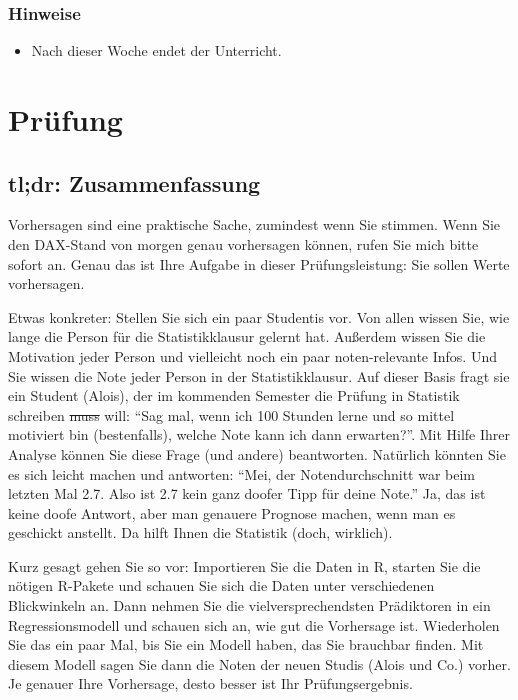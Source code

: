 \documentclass[
]{book}
\providecommand{\tightlist}{%
  \setlength{\itemsep}{0pt}\setlength{\parskip}{0pt}}
\begin{document}
\hypertarget{hinweise-5}{%
\subsection{Hinweise}\label{hinweise-5}}

\begin{itemize}
\tightlist
\item
  Nach dieser Woche endet der Unterricht.
\end{itemize}

\hypertarget{pruxfcfung}{%
\chapter{Prüfung}\label{pruxfcfung}}

\hypertarget{tldr-zusammenfassung}{%
\section{tl;dr: Zusammenfassung}\label{tldr-zusammenfassung}}

Vorhersagen sind eine praktische Sache, zumindest wenn Sie stimmen.
Wenn Sie den DAX-Stand von morgen genau vorhersagen können,
rufen Sie mich bitte sofort an. Genau das ist Ihre Aufgabe in dieser Prüfungsleistung:
Sie sollen Werte vorhersagen.

Etwas konkreter: Stellen Sie sich ein paar Studentis vor.
Von allen wissen Sie, wie lange die Person für die Statistikklausur gelernt hat.
Außerdem wissen Sie die Motivation jeder Person und vielleicht noch ein paar noten-relevante Infos.
Und Sie wissen die Note jeder Person in der Statistikklausur.
Auf dieser Basis fragt sie ein Student (Alois), der im kommenden Semester die Prüfung in Statistik schreiben \sout{muss} will:
``Sag mal, wenn ich 100 Stunden lerne und so mittel motiviert bin (bestenfalls), welche Note kann ich dann erwarten?''.
Mit Hilfe Ihrer Analyse können Sie diese Frage (und andere) beantworten.
Natürlich könnten Sie es sich leicht machen und antworten:
``Mei, der Notendurchschnitt war beim letzten Mal 2.7.
Also ist 2.7 kein ganz doofer Tipp für deine Note.''
Ja, das ist keine doofe Antwort, aber man genauere Prognose machen,
wenn man es geschickt anstellt.
Da hilft Ihnen die Statistik (doch, wirklich).

Kurz gesagt gehen Sie so vor:
Importieren Sie die Daten in R, starten Sie die nötigen R-Pakete und
schauen Sie sich die Daten unter verschiedenen Blickwinkeln an.
Dann nehmen Sie die vielversprechendsten Prädiktoren in ein Regressionsmodell und schauen sich an,
wie gut die Vorhersage ist.
Wiederholen Sie das ein paar Mal, bis Sie ein Modell haben, das Sie brauchbar finden.
Mit diesem Modell sagen Sie dann die Noten der neuen Studis (Alois und Co.) vorher.
Je genauer Ihre Vorhersage, desto besser ist Ihr Prüfungsergebnis.
\end{document}
